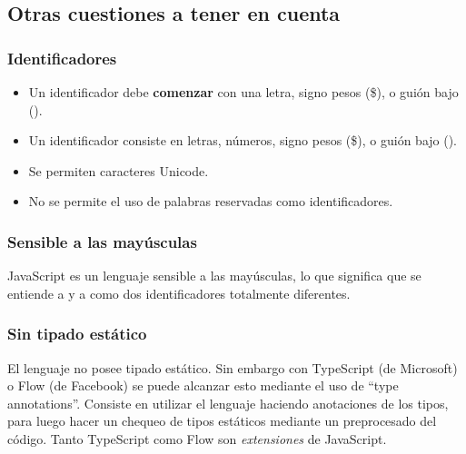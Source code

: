 \subsection{Otras cuestiones a tener en cuenta}

\subsubsection{Identificadores}

\begin{itemize}
\item Un identificador debe \textbf{comenzar} con una letra, signo pesos (\$), o guión bajo (\textunderscore).
\item Un identificador consiste en letras, números, signo pesos (\$), o guión bajo (\textunderscore).
\item Se permiten caracteres Unicode.
\item No se permite el uso de palabras reservadas como identificadores.
\end{itemize}

\subsubsection{Sensible a las mayúsculas}

JavaScript es un lenguaje sensible a las mayúsculas, lo que significa que se entiende a  y a  como dos identificadores totalmente diferentes.

\subsubsection{Sin tipado estático}

El lenguaje no posee tipado estático. Sin embargo con TypeScript (de Microsoft) o Flow (de Facebook) se puede alcanzar esto mediante el uso de "`type annotations"'. Consiste en utilizar el lenguaje haciendo anotaciones de los tipos, para luego hacer un chequeo de tipos estáticos mediante un preprocesado del código. Tanto TypeScript como Flow son \textit{extensiones} de JavaScript. 
